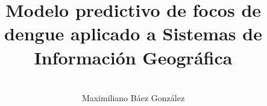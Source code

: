 \documentclass[oneside]{beamer}
\author{\  \\ Maximiliano Báez González}
\title{Modelo predictivo de focos de dengue aplicado a Sistemas de Información Geográfica}
\institute{Facultad Politécnica- UNA}
\date{\thismonth}
\begin{document}
\renewcommand{\inserttotalframenumber}{71}
\begin{frame}[t,plain]
\titlepage
\end{frame}










\end{document}
